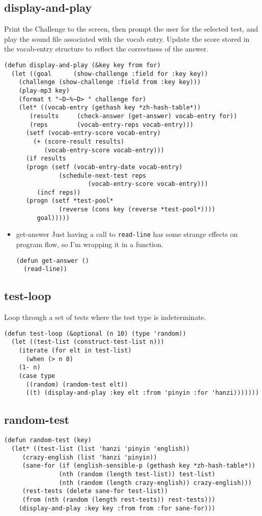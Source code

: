 \documentclass[11pt]{article}
\begin{document}
\subsection{display-and-play}
\label{sec-8-11}
Print the Challenge to the screen, then prompt the user for the selected test,
and play the sound file associated with the vocab entry. Update the score stored
in the vocab-entry structure to reflect the correctness of the answer.
\begin{verbatim}
(defun display-and-play (&key key from for)
  (let ((goal      (show-challenge :field for :key key))
	(challenge (show-challenge :field from :key key)))
    (play-mp3 key)
    (format t "~D~%~D> " challenge for)
    (let* ((vocab-entry (gethash key *zh-hash-table*))
	   (results     (check-answer (get-answer) vocab-entry for))
	   (reps        (vocab-entry-reps vocab-entry)))
      (setf (vocab-entry-score vocab-entry)
	    (+ (score-result results)
	       (vocab-entry-score vocab-entry)))
      (if results
	  (progn (setf (vocab-entry-date vocab-entry)
		       (schedule-next-test reps
					   (vocab-entry-score vocab-entry)))
		 (incf reps))
	  (progn (setf *test-pool*
		       (reverse (cons key (reverse *test-pool*))))
		 goal)))))
\end{verbatim}
\begin{itemize}
\item get-answer
\label{sec-8-11-0-1}
Just having a call to \texttt{read-line} has some strange effects on program flow, so
I'm wrapping it in a function.
\begin{verbatim}
(defun get-answer ()
  (read-line))
\end{verbatim}
\end{itemize}
\subsection{test-loop}
\label{sec-8-12}
Loop through a set of tests where the test type is indeterminate.
\begin{verbatim}
(defun test-loop (&optional (n 10) (type 'random))
  (let ((test-list (construct-test-list n)))
    (iterate (for elt in test-list)
      (when (> n 0)
	(1- n)
	(case type
	  ((random) (random-test elt))
	  ((t) (display-and-play :key elt :from 'pinyin :for 'hanzi)))))))
\end{verbatim}
\subsection{random-test}
\label{sec-8-13}
\begin{verbatim}
(defun random-test (key)
  (let* ((test-list (list 'hanzi 'pinyin 'english))
	 (crazy-english (list 'hanzi 'pinyin))
	 (sane-for (if (english-sensible-p (gethash key *zh-hash-table*))
		       (nth (random (length test-list)) test-list)
		       (nth (random (length crazy-english)) crazy-english)))
	 (rest-tests (delete sane-for test-list))
	 (from (nth (random (length rest-tests)) rest-tests)))
    (display-and-play :key key :from from :for sane-for)))
\end{verbatim}
\end{document}
